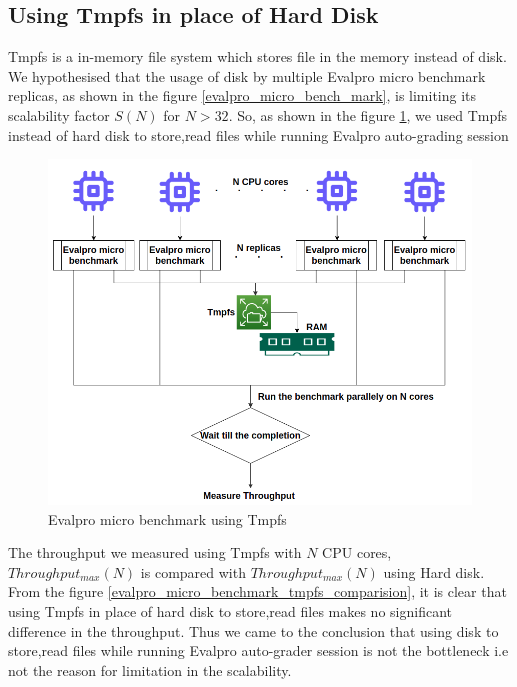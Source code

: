 \documentclass[sigconf]{acmart}
\begin{document}
\subsection{Using Tmpfs in place of Hard Disk}
Tmpfs is a in-memory file system which stores file in the memory instead of disk. We hypothesised that the usage of disk by multiple Evalpro micro benchmark replicas, as shown in the figure \ref{evalpro_micro_bench_mark}, is limiting its scalability factor $S(N)$ for $N>32$. So, as shown in the figure \ref{evalpro_micro_benchmark_tmpfs}, we used Tmpfs instead of hard disk to store,read files while running Evalpro auto-grading session
\begin{figure}[!htb]
  \centering
  \includegraphics[width=\linewidth]{Pictures/evalpro_micro_benchmatk_tmpfs.png}
  \caption{ Evalpro micro benchmark using Tmpfs}
  \label{evalpro_micro_benchmark_tmpfs}
\end{figure}


The throughput we measured using Tmpfs with $N$ CPU cores, $Throughput_{max}(N)$ is compared with $Throughput_{max}(N)$ using Hard disk. From the figure \ref{evalpro_micro_benchmark_tmpfs_comparision}, it is clear that using Tmpfs in place of hard disk to store,read files  makes no significant difference in the throughput. Thus we came to the conclusion that using disk to store,read files while running Evalpro auto-grader session is not the bottleneck i.e not the reason for limitation in the scalability.
\end{document}
